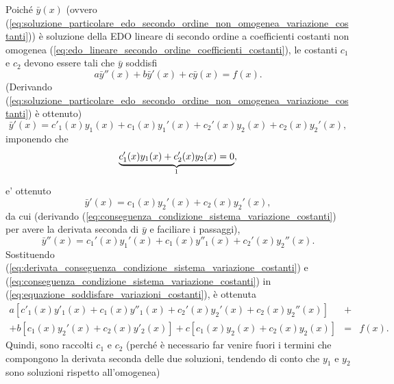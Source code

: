 \noindent Poiché $\bar y(x)$ (ovvero (\ref{eq:soluzione_particolare_edo_secondo_ordine_non_omogenea_variazione_costanti})) è soluzione della EDO lineare di secondo ordine a coefficienti costanti non omogenea (\ref{eq:edo_lineare_secondo_ordine_coefficienti_costanti}), le costanti $c_1$ e $c_2$ devono essere tali che $\bar{y}$ soddisfi
\begin{equation}\label{eq:equazione_soddisfare_variazioni_costanti}
	a\bar{y}''(x) + b\bar{y}'(x) + c\bar{y}(x) = f(x).
\end{equation}
(Derivando (\ref{eq:soluzione_particolare_edo_secondo_ordine_non_omogenea_variazione_costanti}) è ottenuto)
\begin{equation*}
	\bar{y}'(x) = c'_1(x) y_1(x) + c_1(x)y_1'(x) + c_2'(x)y_2(x) + c_2(x)y_2'(x),
\end{equation*}
imponendo che
\begin{equation}\label{eq:condizione_sistema_risoluzione_edo_lineare_secondo_ordine_non_omogonea_variazione}
	\underbrace{c_1'(x)y_1(x) + c_2'(x) y_2(x) = 0}_{\footnotemark},
\end{equation}
e' ottenuto
\begin{equation}\label{eq:conseguenza_condizione_sistema_variazione_costanti}
	\bar{y}'(x) = c_1(x) y_2'(x) + c_2(x) y_2'(x),
\end{equation}
da cui (derivando (\ref{eq:conseguenza_condizione_sistema_variazione_costanti}) per avere la derivata seconda di $\bar{y}$ e faciliare i passaggi),
\begin{equation}\label{eq:derivata_conseguenza_condizione_sistema_variazione_costanti}
	\bar{y}''(x) = c_1'(x) y_1'(x) + c_1(x)y''_1(x) + c_2'(x)y_2''(x).
\end{equation}
Sostituendo (\ref{eq:derivata_conseguenza_condizione_sistema_variazione_costanti}) e (\ref{eq:conseguenza_condizione_sistema_variazione_costanti}) in (\ref{eq:equazione_soddisfare_variazioni_costanti}), è ottenuta
\begin{equation}\label{eq:punto_inizio_trucco}
	\begin{matrix}
		a[c'_1(x)y'_1(x) + c_1(x) y''_1(x) + c_2'(x) y_2'(x) + c_2(x) y_2''(x)] &+&\\
		+ b[c_1(x) y_2'(x) + c_2(x)y'_2(x)] + c[c_1(x)y_2(x) + c_2(x)y_2(x)] &=& f(x).
	\end{matrix}
\end{equation}
Quindi, sono raccolti $c_1$ e $c_2$ (perché è necessario far venire fuori i termini che compongono la derivata seconda delle due soluzioni, tendendo di conto che $y_1$ e $y_2$ sono soluzioni rispetto all'omogenea)

